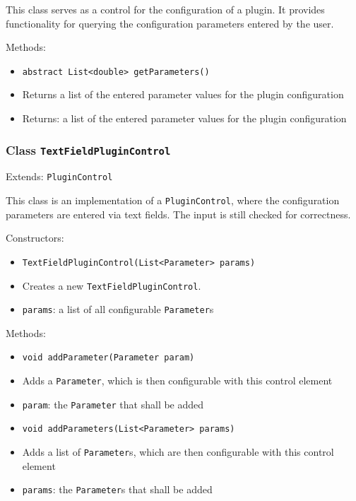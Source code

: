 \documentclass[parskip=full,11pt]{scrartcl}
\begin{document}
This class serves as a control for the configuration of a plugin. It provides functionality for querying the configuration parameters entered by the user.

Methods:

\begin{itemize}\itemsep -10pt
	\item \texttt{abstract List<double> getParameters()}
	\item[] Returns a list of the entered parameter values for the plugin configuration
	\item[] Returns: a list of the entered parameter values for the plugin configuration
\end{itemize}

\subsubsection{Class \texttt{TextFieldPluginControl}}
Extends: \texttt{PluginControl}

This class is an implementation of a \texttt{PluginControl}, where the configuration parameters are entered via text fields. The input is still checked for correctness.

Constructors:

\begin{itemize}\itemsep -10pt
	\item \texttt{TextFieldPluginControl(List<Parameter> params)}
	\item[] Creates a new \texttt{TextFieldPluginControl}.
	\item[] \texttt{params}: a list of all configurable \texttt{Parameter}s
\end{itemize}

Methods:

\begin{itemize}\itemsep -10pt
	\item \texttt{void addParameter(Parameter param)}
	\item[] Adds a \texttt{Parameter}, which is then configurable with this control element
	\item[] \texttt{param}: the \texttt{Parameter} that shall be added
	\item \texttt{void addParameters(List<Parameter> params)}
	\item[] Adds a list of \texttt{Parameter}s, which are then configurable with this control element
	\item[] \texttt{params}: the \texttt{Parameter}s that shall be added
\end{itemize}
\end{document}
